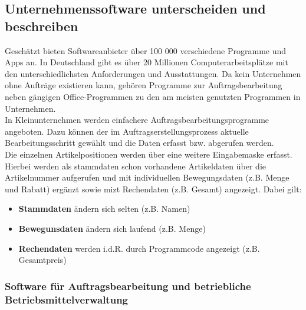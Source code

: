 \documentclass[a4paper, 12pt]{report}
\begin{document}
\begin{multicols}{2}
\subsection{Unternehmenssoftware unterscheiden und beschreiben}

Geschätzt bieten Softwareanbieter über 100 000 verschiedene Programme und Apps
an. In Deutschland gibt es über 20 Millionen Computerarbeitsplätze mit den
unterschiedlichsten Anforderungen und Ausstattungen. Da kein Unternehmen ohne
Aufträge existieren kann, gehören Programme zur Auftragsbearbeitung neben
gängigen Office-Programmen zu den am meisten genutzten Programmen in
Unternehmen. \\

In Kleinunternehmen werden einfachere Auftragsbearbeitungsprogramme angeboten.
Dazu können der im Auftragserstellungsprozess aktuelle Bearbeitungsschritt
gewählt und die Daten erfasst bzw. abgerufen werden. \\

Die einzelnen Artikelpositionen werden über eine weitere Eingabemaske erfasst.
Hierbei werden als  stammdaten schon vorhandene Artikeldaten über die
Artikelnummer aufgerufen und mit individuellen Bewegungsdaten (z.B. Menge und
Rabatt) ergänzt sowie mizt Rechendaten (z.B. Gesamt) angezeigt. Dabei  gilt:

\begin{itemize}
    \item \textbf{Stammdaten} ändern sich selten (z.B. Namen)
    \item \textbf{Bewegunsdaten} ändern sich laufend (z.B. Menge)
    \item \textbf{Rechendaten} werden i.d.R. durch Programmcode angezeigt (z.B.
	Gesamtpreis)
\end{itemize}

\subsubsection{Software für Auftragsbearbeitung und betriebliche
Betriebsmittelverwaltung}


\end{multicols}
\end{document}
